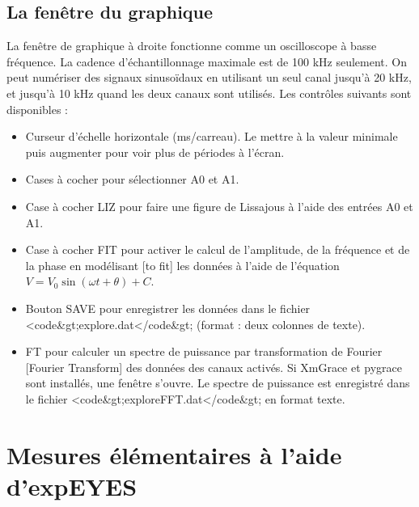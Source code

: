 \documentclass{book}
\begin{document}
\subsection{La fenêtre du graphique}





La fenêtre de graphique à droite fonctionne comme un oscilloscope à basse fréquence. La cadence d'échantillonnage maximale est de 100 kHz seulement. On peut numériser des signaux sinusoïdaux en utilisant un seul canal jusqu'à 20 kHz, et jusqu'à 10 kHz quand les deux canaux sont utilisés. Les contrôles suivants sont disponibles :



\begin{itemize}
  \item Curseur d'échelle horizontale (ms/carreau). Le mettre à la valeur minimale puis augmenter pour voir plus de périodes à l'écran.
  \item Cases à cocher pour sélectionner A0 et A1.
  \item Case à cocher LIZ pour faire une figure de Lissajous à l'aide des entrées A0 et A1.
  \item Case à cocher FIT pour activer le calcul de l'amplitude, de la fréquence et de la phase en modélisant [to fit] les données à l'aide de l'équation $V=V_{0}\sin\left(\omega t+\theta\right)+C$.
  \item Bouton SAVE pour enregistrer les données dans le fichier <code\&gt;explore.dat</code\&gt; (format : deux colonnes de texte).
  \item FT pour calculer un spectre de puissance par transformation de Fourier [Fourier Transform] des données des canaux activés. Si XmGrace et pygrace sont installés, une fenêtre s'ouvre. Le spectre de puissance est enregistré dans le fichier <code\&gt;exploreFFT.dat</code\&gt; en format texte.
\end{itemize}




\section{Mesures élémentaires à l'aide d'expEYES}
\end{document}
